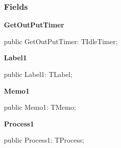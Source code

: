 \documentclass{report}
\newif\ifpdf
\begin{document}
\subsubsection*{\large{\textbf{Fields}}\normalsize\hspace{1ex}\hfill}
\begin{list}{}{
\setlength{\itemindent}{0cm}
\setlength{\listparindent}{0cm}
\setlength{\leftmargin}{\evensidemargin}
\addtolength{\leftmargin}{\tmplength}
\settowidth{\labelsep}{X}
\addtolength{\leftmargin}{\labelsep}
\setlength{\labelwidth}{\tmplength}
}
\label{pkgconvertdisp.TConvDisp-GetOutPutTimer}
\item[\textbf{GetOutPutTimer}\hfill]
\ifpdf
\begin{flushleft}
\fi
\begin{ttfamily}
public GetOutPutTimer: TIdleTimer;\end{ttfamily}

\ifpdf
\end{flushleft}
\fi


\par  \label{pkgconvertdisp.TConvDisp-Label1}
\item[\textbf{Label1}\hfill]
\ifpdf
\begin{flushleft}
\fi
\begin{ttfamily}
public Label1: TLabel;\end{ttfamily}

\ifpdf
\end{flushleft}
\fi


\par  \label{pkgconvertdisp.TConvDisp-Memo1}
\item[\textbf{Memo1}\hfill]
\ifpdf
\begin{flushleft}
\fi
\begin{ttfamily}
public Memo1: TMemo;\end{ttfamily}

\ifpdf
\end{flushleft}
\fi


\par  \label{pkgconvertdisp.TConvDisp-Process1}
\item[\textbf{Process1}\hfill]
\ifpdf
\begin{flushleft}
\fi
\begin{ttfamily}
public Process1: TProcess;\end{ttfamily}

\ifpdf
\end{flushleft}
\fi


\par  \end{list}
\end{document}
